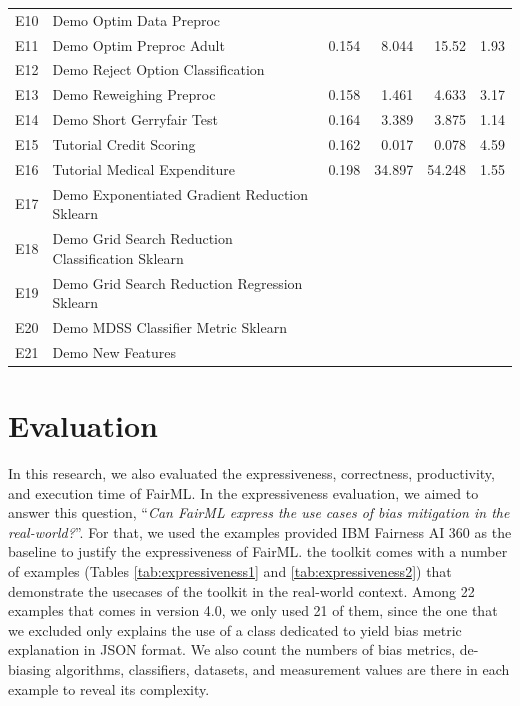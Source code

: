 \documentclass[sigconf,review]{acmart}
\begin{document}
\begin{table}[]
\begin{tabular}{clrrrr}
		E10 & Demo Optim Data Preproc                           &       &        &        &      \\
		E11 & Demo Optim Preproc Adult                          & 0.154 & 8.044  & 15.52  & 1.93 \\
		E12 & Demo Reject Option Classification                 &       &        &        &      \\
		E13 & Demo Reweighing Preproc                           & 0.158 & 1.461  & 4.633  & 3.17 \\
		E14 & Demo Short Gerryfair Test                         & 0.164 & 3.389  & 3.875  & 1.14 \\
		E15 & Tutorial Credit Scoring                           & 0.162 & 0.017  & 0.078  & 4.59 \\
		E16 & Tutorial Medical Expenditure                      & 0.198 & 34.897 & 54.248 & 1.55 \\
		E17 & Demo Exponentiated Gradient Reduction Sklearn     &       &        &        &      \\
		E18 & Demo Grid Search Reduction Classification Sklearn &       &        &        &      \\
		E19 & Demo Grid Search Reduction Regression Sklearn     &       &        &        &      \\
		E20 & Demo MDSS Classifier Metric Sklearn               &       &        &        &      \\
		E21 & Demo New Features                                 &       &        &        &      \\ \hline
	\end{tabular}
\end{table}

\section{Evaluation}
\label{sec:evaluation}
In this research, we also evaluated the expressiveness, correctness, productivity, and execution time of FairML. In the expressiveness evaluation, we aimed to answer this question, 
``\textit{Can FairML express the use cases of bias mitigation in the real-world?}''. For that, we used the examples provided IBM Fairness AI 360 as the baseline to justify the expressiveness of FairML. 
the toolkit comes with a number of examples (Tables \ref{tab:expressiveness1} and \ref{tab:expressiveness2}) that demonstrate 
the usecases of the toolkit in the real-world context. 
Among 22 examples that comes in version 4.0, we only used 21 of them, 
since the one that we excluded only explains the use of a class dedicated to yield bias metric explanation in JSON format. We also count the numbers of bias metrics, de-biasing algorithms, classifiers, datasets, and measurement values are there in each example to reveal its complexity. 
\end{document}
